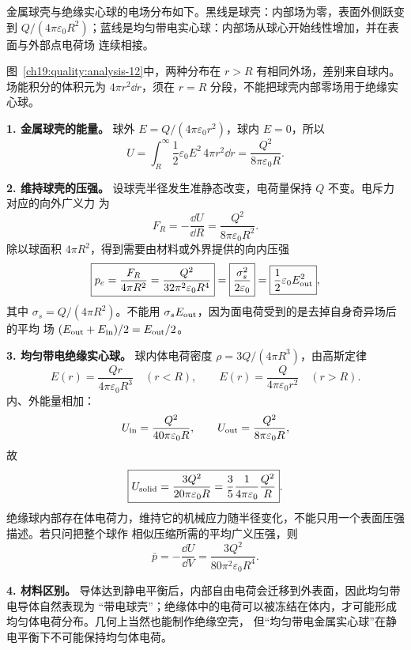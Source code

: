 \begin{xesolution}
金属球壳与绝缘实心球的电场分布如下。黑线是球壳：内部场为零，表面外侧跃变到
$Q/(4\pi\varepsilon_0R^2)$；蓝线是均匀带电实心球：内部场从球心开始线性增加，并在表面与外部点电荷场
连续相接。

\begin{qualityfigure}
\chargedSphereEnergyFigure
{}\label{ch19:quality:analysis-12}
\end{qualityfigure}
图~\ref{ch19:quality:analysis-12}中，两种分布在 $r>R$ 有相同外场，差别来自球内。场能积分的体积元为 $4\pi r^2\dd r$，须在 $r=R$ 分段，不能把球壳内部零场用于绝缘实心球。

\textbf{1. 金属球壳的能量。} 球外
$E=Q/(4\pi\varepsilon_0r^2)$，球内 $E=0$，所以
\[
  U=\int_R^\infty\frac12\varepsilon_0E^2\,4\pi r^2\dd r
  =\boxed{\frac{Q^2}{8\pi\varepsilon_0R}}.
\]

\textbf{2. 维持球壳的压强。} 设球壳半径发生准静态改变，电荷量保持 $Q$ 不变。电斥力对应的向外广义力
为
\[
  F_R=-\frac{\dd U}{\dd R}
  =\frac{Q^2}{8\pi\varepsilon_0R^2}.
\]
除以球面积 $4\pi R^2$，得到需要由材料或外界提供的向内压强
\[
  \boxed{p_e=\frac{F_R}{4\pi R^2}
  =\frac{Q^2}{32\pi^2\varepsilon_0R^4}}
  =\boxed{\frac{\sigma_s^2}{2\varepsilon_0}}
  =\boxed{\frac12\varepsilon_0E_{\rm out}^2},
\]
其中 $\sigma_s=Q/(4\pi R^2)$。不能用 $\sigma_sE_{\rm out}$，因为面电荷受到的是去掉自身奇异场后的平均
场 $(E_{\rm out}+E_{\rm in})/2=E_{\rm out}/2$。

\textbf{3. 均匀带电绝缘实心球。} 球内体电荷密度
$\rho=3Q/(4\pi R^3)$，由高斯定律
\[
  E(r)=\frac{Qr}{4\pi\varepsilon_0R^3}\quad(r<R),
  \qquad
  E(r)=\frac{Q}{4\pi\varepsilon_0r^2}\quad(r>R).
\]
内、外能量相加：
\[
  U_{\rm in}=\frac{Q^2}{40\pi\varepsilon_0R},
  \qquad U_{\rm out}=\frac{Q^2}{8\pi\varepsilon_0R},
\]
故
\[
  \boxed{U_{\rm solid}=\frac{3Q^2}{20\pi\varepsilon_0R}
  =\frac35\frac{1}{4\pi\varepsilon_0}\frac{Q^2}{R}}.
\]
绝缘球内部存在体电荷力，维持它的机械应力随半径变化，不能只用一个表面压强描述。若只问把整个球作
相似压缩所需的平均广义压强，则
\[
  \bar p=-\frac{\dd U}{\dd V}
  =\frac{3Q^2}{80\pi^2\varepsilon_0R^4}.
\]

\textbf{4. 材料区别。} 导体达到静电平衡后，内部自由电荷会迁移到外表面，因此均匀带电导体自然表现为
“带电球壳”；绝缘体中的电荷可以被冻结在体内，才可能形成均匀体电荷分布。几何上当然也能制作绝缘空壳，
但“均匀带电金属实心球”在静电平衡下不可能保持均匀体电荷。
\end{xesolution}



